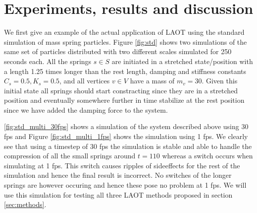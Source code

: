 \documentclass[11pt]{article}
\begin{document}
\section{Experiments, results and discussion}
\label{sec:experiments}

We first give an example of the actual application of LAOT using the
standard simulation of mass spring particles. Figure \ref{fig:std} shows two
simulations of the same set of particles distributed with two different scales
simulated for 250 seconds each. All the springs $s \in S$ are initiated in a
stretched state/position with a length 1.25 times longer than the rest length,
damping and stiffness constants $C_s = 0.5, K_s = 0.5$, and all vertices $v
\in V$ have a mass of $m_v = 30$. Given this initial state all springs should
start constracting since they are in a stretched position and eventually
somewhere further in time stabilize at the rest position since we have added
the damping force to the system.

\ref{fig:std_multi_30fps} shows a simulation of the system described above
using 30 fps and Figure \ref{fig:std_multi_1fps} shows the simulation using 1
fps. We clearly see that using a timestep of 30 fps the simulation is stable
and able to handle the compression of all the small springs around $t = 110$
whereas a switch occurs when simulating at 1 fps. This switch causes ripples
of sideeffects for the rest of the simulation and hence the final result is
incorrect. No switches of the longer springs are however occuring and hence
these pose no problem at 1 fps. We will use this simulation for testing all
three LAOT methods proposed in section \ref{sec:methods}.
\end{document}
